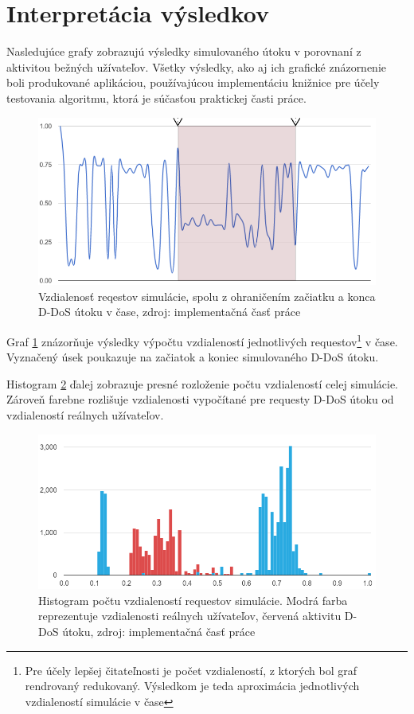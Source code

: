 \documentclass[
  printed, %
  table,   %
  lof,     %
  nolot,   %
  nocover
]{fithesis3}
\begin{document}
\section{Interpretácia výsledkov}
Nasledujúce grafy zobrazujú výsledky simulovaného útoku v porovnaní z aktivitou
bežných užívateľov. Všetky výsledky, ako aj ich grafické znázornenie boli
produkované aplikáciou, používajúcou implementáciu knižnice pre účely testovania
algoritmu, ktorá je súčasťou praktickej časti práce.

\begin{figure}[H]
  \centering
    \includegraphics[width=.95\textwidth]{images/data-flow.png}
  \caption{Vzdialenosť reqestov simulácie, spolu z ohraničením začiatku a konca
  D-DoS útoku v čase, zdroj: implementačná časť práce}
  \label{fig:data-flow}
\end{figure}

Graf \ref{fig:data-flow} znázorňuje výsledky výpočtu vzdialeností jednotlivých
requestov\footnote{Pre účely lepšej čitateľnosti je počet vzdialeností, z
ktorých bol graf rendrovaný redukovaný. Výsledkom je teda aproximácia
jednotlivých vzdialeností simulácie v čase} v čase. Vyznačený úsek poukazuje na
začiatok a koniec simulovaného D-DoS útoku.

Histogram \ref{fig:data-histogram} ďalej zobrazuje presné rozloženie počtu
vzdialeností celej simulácie. Zároveň farebne rozlišuje vzdialenosti vypočítané
pre requesty D-DoS útoku od vzdialeností reálnych užívateľov. 

\begin{figure}[h]
  \centering
    \includegraphics[width=\textwidth]{images/data-histogram.png}
  \caption{Histogram počtu vzdialeností requestov simulácie. Modrá farba
  reprezentuje vzdialenosti reálnych užívateľov, červená aktivitu D-DoS útoku,
  zdroj: implementačná časť práce}
  \label{fig:data-histogram}
\end{figure}
\end{document}
